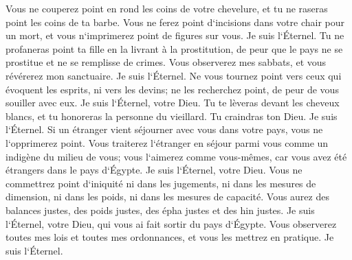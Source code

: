 \verse Vous ne couperez point en rond les coins de votre chevelure, et tu ne raseras point les coins de ta barbe. 
\verse Vous ne ferez point d`incisions dans votre chair pour un mort, et vous n`imprimerez point de figures sur vous. Je suis l`Éternel. 
\verse Tu ne profaneras point ta fille en la livrant à la prostitution, de peur que le pays ne se prostitue et ne se remplisse de crimes. 
\verse Vous observerez mes sabbats, et vous révérerez mon sanctuaire. Je suis l`Éternel. 
\verse Ne vous tournez point vers ceux qui évoquent les esprits, ni vers les devins; ne les recherchez point, de peur de vous souiller avec eux. Je suis l`Éternel, votre Dieu. 
\verse Tu te lèveras devant les cheveux blancs, et tu honoreras la personne du vieillard. Tu craindras ton Dieu. Je suis l`Éternel. 
\verse Si un étranger vient séjourner avec vous dans votre pays, vous ne l`opprimerez point. 
\verse Vous traiterez l`étranger en séjour parmi vous comme un indigène du milieu de vous; vous l`aimerez comme vous-mêmes, car vous avez été étrangers dans le pays d`Égypte. Je suis l`Éternel, votre Dieu. 
\verse Vous ne commettrez point d`iniquité ni dans les jugements, ni dans les mesures de dimension, ni dans les poids, ni dans les mesures de capacité. 
\verse Vous aurez des balances justes, des poids justes, des épha justes et des hin justes. Je suis l`Éternel, votre Dieu, qui vous ai fait sortir du pays d`Égypte. 
\verse Vous observerez toutes mes lois et toutes mes ordonnances, et vous les mettrez en pratique. Je suis l`Éternel. 

